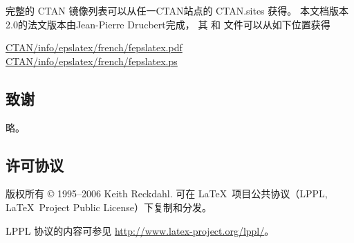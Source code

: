 完整的 CTAN 镜像列表可以从任一CTAN站点的 CTAN.sites 获得。
本文档版本2.0的法文版本由Jean-Pierre Drucbert完成，
其  和  文件可以从如下位置获得
\begin{center}
	\href{ftp://ctan.tug.org/tex-archive/info/epslatex/french/fepslatex.pdf}{CTAN/info/epslatex/french/fepslatex.pdf} \\
	\href{ftp://ctan.tug.org/tex-archive/info/epslatex/french/fepslatex.ps}{CTAN/info/epslatex/french/fepslatex.ps}
\end{center}

\subsection*{致谢}
略。

\subsection*{许可协议}
版权所有 \copyright{} 1995--2006  Keith Reckdahl.
可在 \LaTeX\ 项目公共协议（LPPL, \LaTeX\ Project Public License）下复制和分发。

LPPL 协议的内容可参见 \url{http://www.latex-project.org/lppl/}。



\clearpage
\endinput
